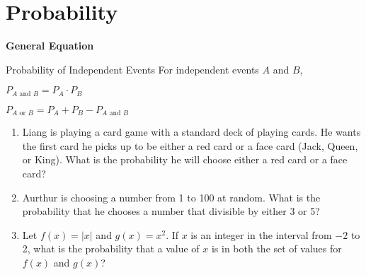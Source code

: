 \section{Probability}

\textbf{General Equation}

\bigskip
\begin{equationbox}{Probability of Independent Events}
\renewcommand{\columnseprule}{0pt}
For independent events $A$ and $B$,

\begin{center}
\begin{multicols}{2}
$P_{A\mbox{ and }B}=P_A\cdot P_B$

$P_{A\mbox{ or }B}=P_A+P_B-P_{A\mbox{ and }B}$
\end{multicols}
\end{center}
\end{equationbox}

\bigskip
\begin{enumerate}[labelindent=*,style=multiline,leftmargin=*,label=\textbf{Example \arabic*:}]
\item Liang is playing a card game with a standard deck of playing cards. He wants the first card he picks up to be either a red card or a face card (Jack, Queen, or King). What is the probability he will choose either a red card or a face card?
\vfill\item Aurthur is choosing a number from 1 to 100 at random. What is the probability that he chooses a number that divisible by either 3 or 5?
\vfill\item Let $f(x)=|x|$ and $g(x)=x^2$. If $x$ is an integer in the interval from $-2$ to 2, what is the probability that a value of $x$ is in both the set of values for $f(x)$ and $g(x)$?
\end{enumerate}


